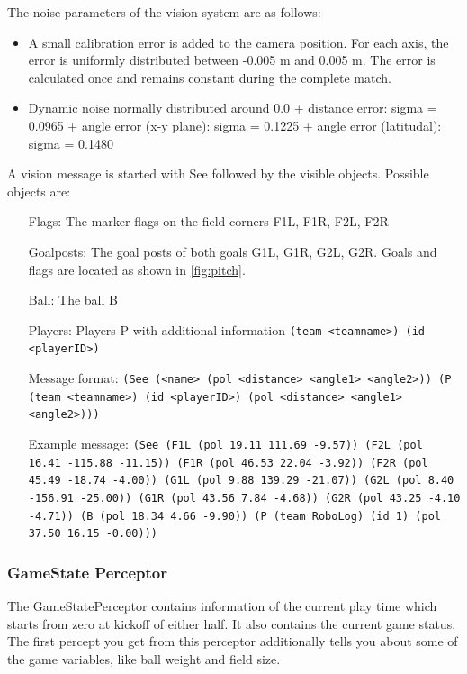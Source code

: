 The noise parameters of the vision system are as follows:
\begin{itemize}
  \item A small calibration error is added to the camera position. For each
  axis, the error is uniformly distributed between -0.005 m and 0.005 m. The
  error is calculated once and remains constant during the complete match.
  \item Dynamic noise normally distributed around 0.0
  + distance error:  sigma = 0.0965
  + angle error (x-y plane): sigma = 0.1225
  + angle error (latitudal): sigma = 0.1480
\end{itemize}

A vision message is started with See followed by the visible objects.
Possible objects are:
\begin{itemize}
	\item[Flags:] The marker flags on the field corners F1L, F1R, F2L, F2R
	\item[Goalposts:] The goal posts of both goals G1L, G1R, G2L, G2R. Goals and
	flags are located as shown in \ref{fig:pitch}.
	\item[Ball:] The ball B 
	\item[Players:] Players P with additional information \texttt{(team <teamname>)
	(id <playerID>)}
\end{itemize}
\begin{itemize}
	\item[Message format:] \texttt{(See (<name> (pol <distance> <angle1>
	<angle2>)) (P (team <teamname>) (id <playerID>) (pol <distance> <angle1> <angle2>)))}
	\item[Example message:] \texttt{(See (F1L (pol 19.11 111.69 -9.57)) (F2L (pol 
	16.41 -115.88 -11.15)) (F1R (pol 46.53 22.04 -3.92)) (F2R (pol 45.49 -18.74
	-4.00)) (G1L (pol 9.88 139.29 -21.07)) (G2L (pol 8.40 -156.91 -25.00)) (G1R
	(pol 43.56 7.84 -4.68)) (G2R (pol 43.25 -4.10 -4.71)) (B (pol 18.34 4.66
	-9.90)) (P (team RoboLog) (id 1) (pol 37.50 16.15 -0.00)))}
\end{itemize}

\subsubsection{GameState Perceptor}
The GameStatePerceptor contains information of the current play time which
starts from zero at kickoff of either half. It also contains the current game status.
The first percept you get from this perceptor additionally tells you about some
of the game variables, like ball weight and field size.

